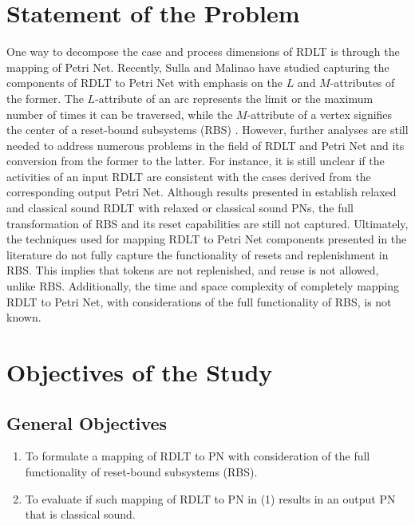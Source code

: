 \documentclass[12pt]{article}
\begin{document}
\section{Statement of the Problem}
One way to decompose the case and process dimensions of RDLT is through the mapping of Petri Net. Recently, Sulla and Malinao \cite{sulla-malinao} have studied capturing the components of RDLT to Petri Net with emphasis on the $L$ and $M$-attributes of the former. The $L$-attribute of an arc represents the limit or the maximum number of times it can be traversed, while the $M$-attribute of a vertex signifies the center of a reset-bound subsystems (RBS) \cite{sulla-malinao}. However, further analyses are still needed to address numerous problems in the field of RDLT and Petri Net and its conversion from the former to the latter. For instance, it is still unclear if the activities of an input RDLT are consistent with the cases derived from the corresponding output Petri Net. Although results presented in \cite{sulla-malinao} establish relaxed and classical sound RDLT with relaxed or classical sound PNs, the full transformation of RBS and its reset capabilities are still not captured. Ultimately, the techniques used for mapping RDLT to Petri Net components presented in the literature do not fully capture the functionality of resets and replenishment in RBS. This implies that tokens are not replenished, and reuse is not allowed, unlike RBS. Additionally, the time and space complexity of completely mapping RDLT to Petri Net, with considerations of the full functionality of RBS, is not known.


\section{Objectives of the Study}
    \subsection{General Objectives}
    \begin{enumerate}
        \item To formulate a mapping of RDLT to PN with consideration of the full functionality of reset-bound subsystems (RBS).
        \item To evaluate if such mapping of RDLT to PN in (1) results in an output PN that is classical sound.
    \end{enumerate}
\end{document}
